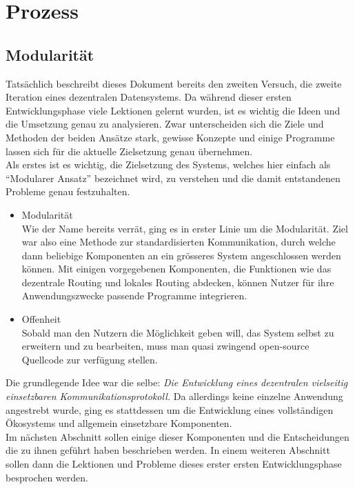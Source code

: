 \documentclass[11pt]{report}
\begin{document}
\part{Prozess}
\label{sec:orgfb75432}
\chapter{Modularität}
\label{sec:org42a7b50}
Tatsächlich beschreibt dieses Dokument bereits den zweiten Versuch,
die zweite Iteration eines dezentralen Datensystems. Da während dieser
ersten Entwicklungsphase viele Lektionen gelernt wurden, ist es
wichtig die Ideen und die Umsetzung genau zu analysieren. Zwar
unterscheiden sich die Ziele und Methoden der beiden Ansätze stark,
gewisse Konzepte und einige Programme lassen sich für die aktuelle
Zielsetzung genau übernehmen.\\

\noindent Als erstes ist es wichtig, die Zielsetzung des Systems,
welches hier einfach als “Modularer Ansatz” bezeichnet wird, zu
verstehen und die damit entstandenen Probleme genau festzuhalten.
\begin{itemize}
\item Modularität \\
Wie der Name bereits verrät, ging es in erster Linie um die
Modularität. Ziel war also eine Methode zur standardisierten
Kommunikation, durch welche dann beliebige Komponenten an ein
grösseres System angeschlossen werden können. Mit einigen
vorgegebenen Komponenten, die Funktionen wie das dezentrale Routing
und lokales Routing abdecken, können Nutzer für ihre
Anwendungszwecke passende Programme integrieren.
\item Offenheit \\
Sobald man den Nutzern die Möglichkeit geben will, das System selbst
zu erweitern und zu bearbeiten, muss man quasi zwingend open-source
Quellcode zur verfügung stellen.
\end{itemize}

\noindent Die grundlegende Idee war die selbe: \emph{Die Entwicklung eines
dezentralen vielseitig einsetzbaren Kommunikationsprotokoll.} Da
allerdings keine einzelne Anwendung angestrebt wurde, ging es
stattdessen um die Entwicklung eines vollständigen Ökosystems und
allgemein einsetzbare Komponenten.\\

\noindent Im nächsten Abschnitt sollen einige dieser Komponenten und
die Entscheidungen die zu ihnen geführt haben beschrieben werden. In
einem weiteren Abschnitt sollen dann die Lektionen und Probleme dieses
erster ersten Entwicklungsphase besprochen werden. 
\end{document}

